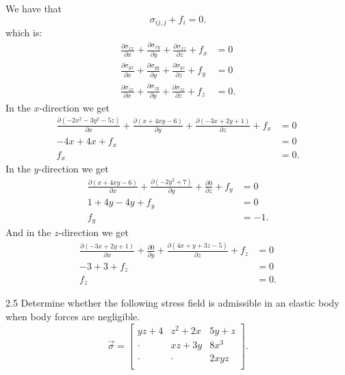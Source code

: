 \begin{derivation}
  We have that
  \begin{equation*}
    \sigma_{ij,j} + f_i = 0
  .\end{equation*}
  which is:
  \begin{align*}
    \frac{\partial \sigma_{x x}}{\partial x} + \frac{\partial \sigma_{xy}}{\partial y} + \frac{\partial \sigma_{xz}}{\partial z} + f_x &= 0 \\
    \frac{\partial \sigma_{y x}}{\partial x} + \frac{\partial \sigma_{yy}}{\partial y} + \frac{\partial \sigma_{yz}}{\partial z} + f_y &= 0 \\
    \frac{\partial \sigma_{z x}}{\partial x} + \frac{\partial \sigma_{zy}}{\partial y} + \frac{\partial \sigma_{zz}}{\partial z} + f_z &= 0
  .\end{align*}
  In the $x$-direction we get
  \begin{align*}
    \frac{\partial (-2x^2 - 3y^2 - 5z)}{\partial x} + \frac{\partial (x + 4xy - 6)}{\partial y} + \frac{\partial (-3x +2y + 1)}{\partial z} + f_x &= 0 \\
    -4x + 4x + f_x &= 0 \\
    f_x &= 0
  .\end{align*}
  In the $y$-direction we get
  \begin{align*}
    \frac{\partial (x + 4 xy - 6)}{\partial x}  + \frac{\partial (- 2 y^2 + 7)}{\partial y} + \frac{\partial 0}{\partial z} + f_y &= 0 \\
    1 + 4y - 4y + f_y &= 0 \\
    f_y &= -1
  .\end{align*}
  And in the $z$-direction we get
  \begin{align*}
    \frac{\partial (-3x + 2y + 1)}{\partial x} + \frac{\partial 0}{\partial y} + \frac{\partial (4x + y + 3z - 5)}{\partial z} + f_z &= 0 \\
    -3 + 3 + f_z &= 0 \\
    f_z &= 0
  .\end{align*}
\end{derivation}


\begin{problem}{2.5}
  Determine whether the following stress field is admissible in an elastic body when body forces are negligible.
  \begin{equation*}
    \Vec{\sigma} = \begin{bmatrix}
      yz+4 & z^2 + 2x & 5y+z\\
    \cdot & xz + 3y & 8x^3\\
    \cdot  & \cdot  & 2xyz\\
    \end{bmatrix}
  .\end{equation*}  
\end{problem}

